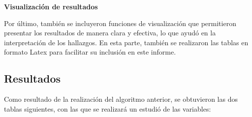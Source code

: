 \documentclass[12pt]{article}
\begin{document}
\begin{description}
	\item {\textbf{Visualización de resultados}} 
	
	Por último, también se incluyeron funciones de visualización que permitieron presentar los resultados de manera clara y efectiva, lo que ayudó en la interpretación de los hallazgos. En esta parte, también se realizaron las tablas en formato Latex para facilitar su inclusión en este informe.
	

\end{description}


\subsection{Resultados}
Como resultado de la realización del algoritmo anterior, se obtuvieron las dos tablas siguientes, con las que se realizará un estudió de las variables:
\end{document}
